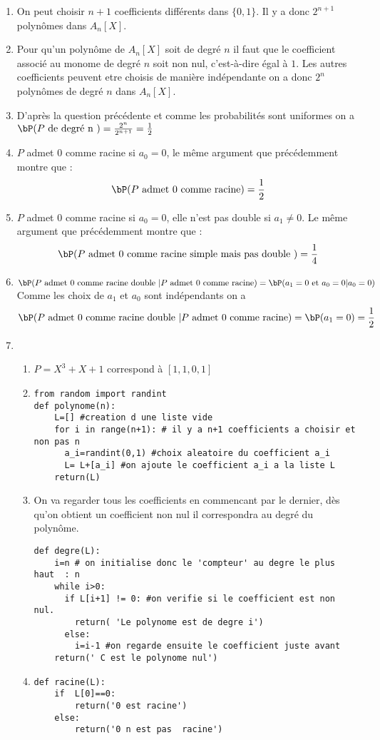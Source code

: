 \begin{correction}
\begin{enumerate}
\item On peut choisir $n+1$ coefficients différents dans $\{0,1\}$. Il y a donc $2^{n+1}$ polynômes dans $A_n[X]$. 
\item Pour qu'un polynôme de $A_n[X]$ soit de degré $n$ il faut que le coefficient associé au monome de degré $n$ soit non nul, c'est-à-dire égal à $1$. Les autres coefficients peuvent etre choisis de manière indépendante on a donc $2^n$  polynômes de degré $n$ dans $A_n[X]$. 
\item D'après la question précédente et comme les probabilités sont uniformes on a $\bP( \text{$ P$ de degré n }) =\frac{2^n}{2^{n+1}} =\frac{1}{2}$
\item $P$ admet $0$ comme racine si $a_0=0$, le même argument que précédemment montre que :
$$\bP( \text{$ P$ admet 0 comme racine}) = \frac{1}{2}$$

\item $P$ admet $0$ comme racine si $a_0=0$, elle n'est pas double si $a_1\neq 0$. Le même argument que précédemment montre que :
$$\bP( \text{$ P$ admet 0 comme racine simple mais pas double }) = \frac{1}{4}$$
\item $\bP( \text{$ P$ admet 0 comme racine  double } | \text{$ P$ admet 0 comme racine}  )  = \bP (a_1= 0 \text{ et } a_0 =0 | a_0 =0 ) $ Comme les choix de $a_1$ et $a_0$ sont indépendants on a 
$$\bP( \text{$ P$ admet 0 comme racine  double } | \text{$ P$ admet 0 comme racine}  )   =\bP (a_1= 0 ) =\frac{1}{2}$$
\item 
\begin{enumerate}
\item $P=X^3+X+1$ correspond à $[1,1,0,1]$
\item 
\begin{lstlisting}
from random import randint
def polynome(n):
	L=[] #creation d une liste vide
	for i in range(n+1): # il y a n+1 coefficients a choisir et non pas n 
	  a_i=randint(0,1) #choix aleatoire du coefficient a_i
	  L= L+[a_i] #on ajoute le coefficient a_i a la liste L
	return(L)		  
\end{lstlisting}
\item 
On va regarder tous les coefficients en commencant par le dernier, dès qu'on obtient un coefficient non nul il correspondra au degré du polynôme. 
\begin{lstlisting}
def degre(L):
	i=n # on initialise donc le 'compteur' au degre le plus haut  : n 
	while i>0:
	  if L[i+1] != 0: #on verifie si le coefficient est non nul. 
	  	return( 'Le polynome est de degre i')
	  else:
	    i=i-1 #on regarde ensuite le coefficient juste avant 
	return(' C est le polynome nul')
\end{lstlisting}

\item 
\begin{lstlisting}
def racine(L):
	if  L[0]==0:
		return('0 est racine')
	else: 
		return('0 n est pas  racine')
\end{lstlisting}
\end{enumerate}
\end{enumerate}
\end{correction}
